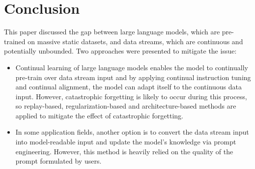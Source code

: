 \documentclass[runningheads]{llncs}
\begin{document}
\section{Conclusion}
This paper discussed the gap between large language models, which are pre-trained on massive static datasets, and data streams, which are continuous and potentially unbounded.
Two approaches were presented to mitigate the issue:
\begin{itemize}
  \item Continual learning of large language models enables the model to continually pre-train over data stream input and by applying continual instruction tuning and continual alignment,
the model can adapt itself to the continuous data input. However, catastrophic forgetting is likely to occur during this process, so replay-based, regularization-based and architecture-based
methods are applied to mitigate the effect of catastrophic forgetting. 
  \item In some application fields, another option is to convert the data stream input into model-readable input and update the model's knowledge via prompt engineering. However, this method is
heavily relied on the quality of the prompt formulated by users.
\end{itemize}
\end{document}
